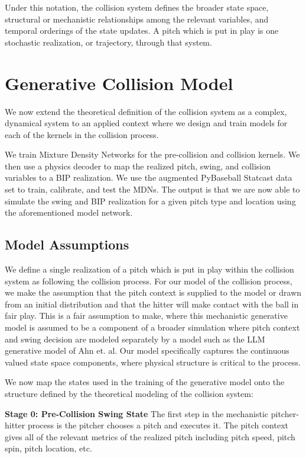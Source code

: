 \documentclass[11pt]{article}
\begin{document}
Under this notation, the collision system defines the broader state space, structural or mechanistic relationships among the relevant variables, and temporal orderings of the state updates. A pitch which is put in play is one stochastic realization, or trajectory, through that system.



\section{Generative Collision Model}

We now extend the theoretical definition of the collision system as a complex, dynamical system to an applied context where we design and train models for each of the kernels in the collision process. 

We train Mixture Density Networks for the pre-collision and collision kernels. We then use a physics decoder to map the realized pitch, swing, and collision variables to a BIP realization. We use the augmented PyBaseball Statcast data set to train, calibrate, and test the MDNs. The output is that we are now able to simulate the swing and BIP realization for a given pitch type and location using the aforementioned model network.


\subsection{Model Assumptions}

We define a single realization of a pitch which is put in play within the collision system as following the collision process. For our model of the collision process, we make the assumption that the pitch context is supplied to the model or drawn from an initial distribution and that the hitter will make contact with the ball in fair play. This is a fair assumption to make, where this mechanistic generative model is assumed to be a component of a broader simulation where pitch context and swing decision are modeled separately by a model such as the LLM generative model of Ahn et. al. Our model specifically captures the continuous valued state space components, where physical structure is critical to the process.

We now map the states used in the training of the generative model onto the structure defined by the theoretical modeling of the collision system: 

 \textbf{Stage 0: Pre-Collision Swing State} The first step in the mechanistic pitcher-hitter process is the pitcher chooses a pitch and executes it. The pitch context gives all of the relevant metrics of the realized pitch including pitch speed, pitch spin, pitch location, etc.
\end{document}

